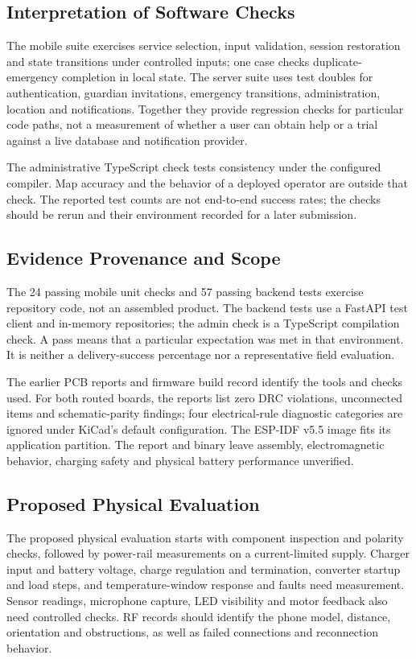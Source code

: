 \documentclass[nolineno]{ieeeaccess}
\begin{document}
\subsection{Interpretation of Software Checks}
The mobile suite exercises service selection, input validation, session restoration and state transitions under controlled inputs; one case checks duplicate-emergency completion in local state. The server suite uses test doubles for authentication, guardian invitations, emergency transitions, administration, location and notifications. Together they provide regression checks for particular code paths, not a measurement of whether a user can obtain help or a trial against a live database and notification provider.

The administrative TypeScript check tests consistency under the configured compiler. Map accuracy and the behavior of a deployed operator are outside that check. The reported test counts are not end-to-end success rates; the checks should be rerun and their environment recorded for a later submission.


\subsection{Evidence Provenance and Scope}
The 24 passing mobile unit checks and 57 passing backend tests exercise repository code, not an assembled product. The backend tests use a FastAPI test client and in-memory repositories; the admin check is a TypeScript compilation check. A pass means that a particular expectation was met in that environment. It is neither a delivery-success percentage nor a representative field evaluation.

The earlier PCB reports and firmware build record identify the tools and checks used. For both routed boards, the reports list zero DRC violations, unconnected items and schematic-parity findings; four electrical-rule diagnostic categories are ignored under KiCad's default configuration. The ESP-IDF v5.5 image fits its application partition. The report and binary leave assembly, electromagnetic behavior, charging safety and physical battery performance unverified.

\subsection{Proposed Physical Evaluation}
The proposed physical evaluation starts with component inspection and polarity checks, followed by power-rail measurements on a current-limited supply. Charger input and battery voltage, charge regulation and termination, converter startup and load steps, and temperature-window response and faults need measurement. Sensor readings, microphone capture, LED visibility and motor feedback also need controlled checks. RF records should identify the phone model, distance, orientation and obstructions, as well as failed connections and reconnection behavior.
\end{document}
